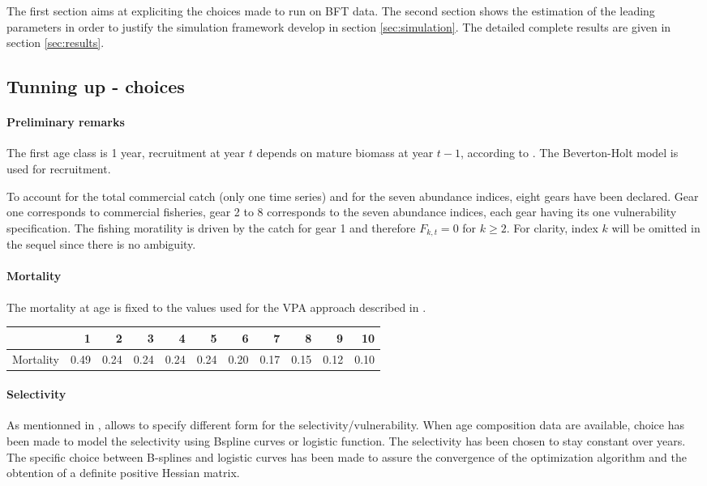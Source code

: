 The first section  aims at expliciting the choices made  to run \iscam
on BFT  data. The second section  shows the estimation of  the leading
parameters in  order to  justify the  simulation framework  develop in
section \ref{sec:simulation}. The detailed  complete results are given
in section \ref{sec:results}.




\subsection{Tunning up \iscam - choices}

\paragraph{Preliminary remarks}
The first age class is 1 year, recruitment at year $t$ depends on
mature  biomass  at  year  $t-1$,  according  to  \cite{tuna2012}.  The
Beverton-Holt model is used for recruitment.


To account for the total commercial catch (only one time series) and
for the seven abundance indices,  eight gears have been declared. Gear
one corresponds  to commercial fisheries,  gear 2 to 8  corresponds to
the seven  abundance indices, each  gear having its  one vulnerability
specification. The fishing moratility is  driven by the catch for gear
1 and  therefore $F_{k,t}=0$ for  $k \geq  2$. For clarity,  index $k$
will be omitted in the sequel since there is no ambiguity.

\paragraph{Mortality}
The mortality at age is fixed to  the values used for the VPA approach
described in \cite{tuna2012}.

\begin{table}[ht]
\centering
\begin{tabular}{rrrrrrrrrrr}
  \hline
 & 1 & 2 & 3 & 4 & 5 & 6 & 7 & 8 & 9 & 10 \\ 
  \hline
Mortality & 0.49 & 0.24 & 0.24 & 0.24 & 0.24 & 0.20 & 0.17 & 0.15 & 0.12 & 0.10 \\ 
   \hline
\end{tabular}
\end{table}


\paragraph{Selectivity}
As mentionned in \cite{Martell12},	 \iscam allows to specify different form for the
selectivity/vulnerability.  When age composition data are available,
choice has been made to model  the selectivity using Bspline curves or
logistic function.  The selectivity has  been chosen to  stay constant
over years. The specific choice between B-splines and logistic curves has been made to 
assure the convergence of the optimization algorithm and the obtention of a definite positive Hessian matrix.



